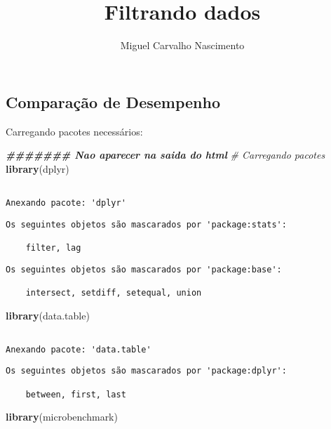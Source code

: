 \documentclass[
]{article}
\title{Filtrando dados}
\author{Miguel Carvalho Nascimento}
\date{}
\newenvironment{Shaded}{\begin{snugshade}}{\end{snugshade}}
\newcommand{\CommentTok}[1]{\textcolor[rgb]{0.56,0.35,0.01}{\textit{#1}}}
\newcommand{\DocumentationTok}[1]{\textcolor[rgb]{0.56,0.35,0.01}{\textbf{\textit{#1}}}}
\newcommand{\FunctionTok}[1]{\textcolor[rgb]{0.13,0.29,0.53}{\textbf{#1}}}
\newcommand{\NormalTok}[1]{#1}
\begin{document}
\maketitle

\subsection{Comparação de
Desempenho}\label{comparauxe7uxe3o-de-desempenho}

Carregando pacotes necessários:

\begin{Shaded}
\begin{Highlighting}[]
\DocumentationTok{\#\#\#\#\#\#\# Nao aparecer na saida do html}
\CommentTok{\# Carregando pacotes}
\FunctionTok{library}\NormalTok{(dplyr)}
\end{Highlighting}
\end{Shaded}

\begin{verbatim}

Anexando pacote: 'dplyr'
\end{verbatim}

\begin{verbatim}
Os seguintes objetos são mascarados por 'package:stats':

    filter, lag
\end{verbatim}

\begin{verbatim}
Os seguintes objetos são mascarados por 'package:base':

    intersect, setdiff, setequal, union
\end{verbatim}

\begin{Shaded}
\begin{Highlighting}[]
\FunctionTok{library}\NormalTok{(data.table)}
\end{Highlighting}
\end{Shaded}

\begin{verbatim}

Anexando pacote: 'data.table'
\end{verbatim}

\begin{verbatim}
Os seguintes objetos são mascarados por 'package:dplyr':

    between, first, last
\end{verbatim}

\begin{Shaded}
\begin{Highlighting}[]
\FunctionTok{library}\NormalTok{(microbenchmark)}
\end{Highlighting}
\end{Shaded}
\end{document}

